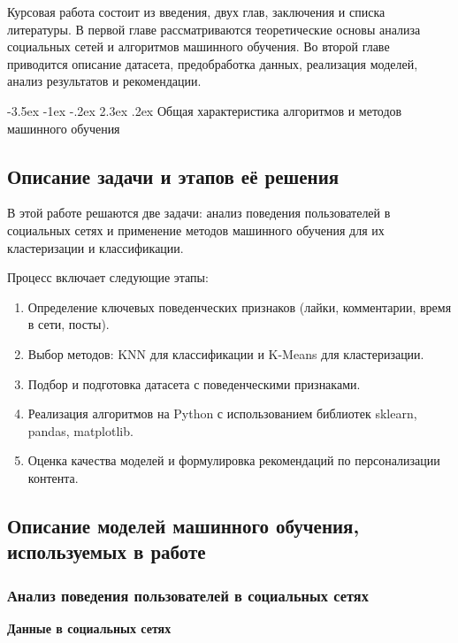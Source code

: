 \documentclass[14pt, a4paper]{extarticle}
\makeatletter
\renewcommand\section{\@startsection {section}{1}{\z@}%
                                   {-3.5ex \@plus -1ex \@minus -.2ex}%
                                   {2.3ex \@plus.2ex}%
                                   {\centering\normalfont\Large\bfseries}}
\makeatother
\begin{document}
Курсовая работа состоит из введения, двух глав, заключения и списка литературы. В первой главе рассматриваются теоретические основы 
анализа социальных сетей и алгоритмов машинного обучения. Во второй главе приводится описание датасета, предобработка данных, реализация
моделей, анализ результатов и рекомендации.

\newpage
\section{Общая характеристика алгоритмов и методов машинного обучения}

\subsection{Описание задачи и этапов её решения}

В этой работе решаются две задачи: анализ поведения пользователей в социальных сетях и применение методов машинного обучения для их кластеризации и классификации.

Процесс включает следующие этапы:

\begin{enumerate}
    \item Определение ключевых поведенческих признаков (лайки, комментарии, время в сети, посты).
    \item Выбор методов: KNN для классификации и K-Means для кластеризации.
    \item Подбор и подготовка датасета с поведенческими признаками.
    \item Реализация алгоритмов на Python с использованием библиотек sklearn, pandas, matplotlib.
    \item Оценка качества моделей и формулировка рекомендаций по персонализации контента.
\end{enumerate}


\subsection{Описание моделей машинного обучения, используемых в работе}


\subsubsection{Анализ поведения пользователей в социальных сетях}

\textbf{Данные в социальных сетях}
\smallskip
\end{document}
